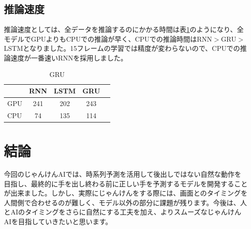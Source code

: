 \subsection{推論速度}
推論速度としては、全データを推論するのにかかる時間は表\ref{tb:time}のようになり、全モデルでGPUよりもCPUでの推論が早く、CPUでの推論時間はRNN$>$GRU$>$LSTMとなりました。15フレームの学習では精度が変わらないので、CPUでの推論速度が一番速いRNNを採用しました。
\begin{table}[h]
    \centering
    \begin{tabular}{l||c|c|c|r}
        &RNN&LSTM&GRU\\ \hline\hline
        GPU & 241 & 202 & 243\\ \hline
        CPU & 74 & 135 & 114 \\ \hline
    \end{tabular}
    \caption{GRU}
    \label{tb:time}
\end{table}

\section{結論}
今回のじゃんけんAIでは、時系列予測を活用して後出しではない自然な動作を目指し、最終的に手を出し終わる前に正しい手を予測するモデルを開発することが出来ました。しかし、実際にじゃんけんをする際には、画面とのタイミングを人間側で合わせるのが難しく、モデル以外の部分に課題が残ります。今後は、人とAIのタイミングをさらに自然にする工夫を加え、よりスムーズなじゃんけんAIを目指していきたいと思います。
